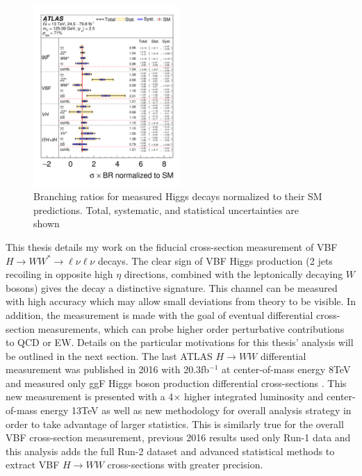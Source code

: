 \begin{figure}[H]
        \centering
    \includegraphics[width=0.5\textwidth] {Pictures/branchingratio.png}\hspace{1cm}
    \caption{Branching ratios for measured Higgs decays normalized to their SM predictions. Total, systematic, and statistical uncertainties are shown \cite{HiggsCurrent}}
    \label{fig:branchingratio}
\end{figure}
This thesis details my work on the fiducial cross-section measurement of VBF $H\rightarrow WW^*\rightarrow\ell\nu\ell\nu$ decays. The clear sign of VBF Higgs production (2 jets recoiling in opposite high $\eta$ directions, combined with the leptonically decaying $W$ bosons) gives the decay a distinctive signature. This channel can be measured with high accuracy which may allow small deviations from theory to be visible. In addition, the measurement is made with the goal of eventual differential cross-section measurements, which can probe higher order perturbative contributions to QCD or EW. Details on the particular motivations for this thesis' analysis will be outlined in the next section. The last ATLAS $H\rightarrow WW$ differential measurement was published in 2016 with 20.3fb$^{-1}$ at center-of-mass energy 8TeV and measured only ggF Higgs boson production differential cross-sections \cite{HiggsDifferential}. This new measurement is presented with a 4$\times$ higher integrated luminosity and center-of-mass energy 13TeV as well as new methodology for overall analysis strategy in order to take advantage of larger statistics. This is similarly true for the overall VBF cross-section measurement, previous 2016 results used only Run-1 data and this analysis adds the full Run-2 dataset and advanced statistical methods to extract VBF $H\rightarrow WW$ cross-sections with greater precision.

